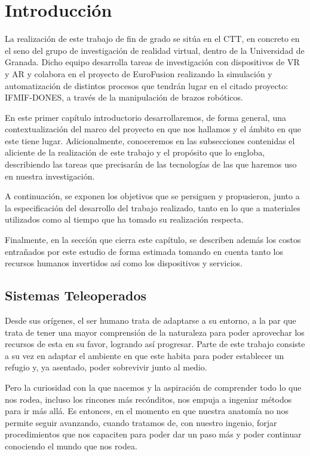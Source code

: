 \chapter{Introducción}
La realización de este trabajo de fin de grado se sitúa en el CTT, en concreto en el seno del grupo de investigación de realidad virtual, dentro de la Universidad de Granada. Dicho equipo desarrolla tareas de investigación con dispositivos de VR y AR y colabora en el proyecto de EuroFusion realizando la simulación y automatización de distintos procesos que tendrán lugar en el citado proyecto: IFMIF-DONES, a través de la manipulación de brazos robóticos.

En este primer capítulo introductorio desarrollaremos, de forma general, una contextualización del marco del proyecto en que nos hallamos y el ámbito en que este tiene lugar. Adicionalmente, conoceremos en las subsecciones contenidas el aliciente de la realización de este trabajo y el propósito que lo engloba, describiendo las tareas que precisarán de las tecnologías de las que haremos uso en nuestra investigación.

A continuación, se exponen los objetivos que se persiguen y propusieron, junto a la especificación del desarrollo del trabajo realizado, tanto en lo que a materiales utilizados como al tiempo que ha tomado su realización respecta.

Finalmente, en la sección que cierra este capítulo, se describen además los costos entrañados por este estudio de forma estimada tomando en cuenta tanto los recursos humanos invertidos así como los dispositivos y servicios. 

\vfill

\section{Sistemas Teleoperados}
Desde sus orígenes, el ser humano trata de adaptarse a su entorno, a la par que trata de tener una mayor comprensión de la naturaleza para poder aprovechar los recursos de esta en su favor, logrando así progresar. Parte de este trabajo consiste a su vez en adaptar el ambiente en que este habita para poder establecer un refugio y, ya asentado, poder sobrevivir junto al medio.

Pero la curiosidad con la que nacemos y la aspiración de comprender todo lo que nos rodea, incluso los rincones más recónditos, nos empuja a ingeniar métodos para ir más allá. Es entonces, en el momento en que nuestra anatomía no nos permite seguir avanzando, cuando tratamos de, con nuestro ingenio, forjar procedimientos que nos capaciten para poder dar un paso más y poder continuar conociendo el mundo que nos rodea.

